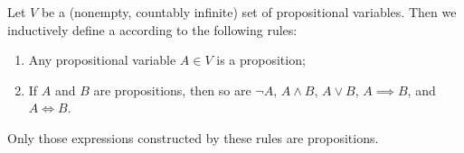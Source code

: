 \begin{node}[Definition]\label{prop-0002}%
Let $V$ be a (nonempty, countably infinite) set of propositional variables. Then
we inductively define a  according to the following
rules:
\begin{enumerate}
\item Any propositional variable $A\in V$ is a proposition;
\item If $A$ and $B$ are propositions, then so are $\neg A$, $A\land B$,
  $A\lor B$, $A\implies B$, and $A\iff B$.
\end{enumerate}
Only those expressions constructed by these rules are propositions.

\end{node}
